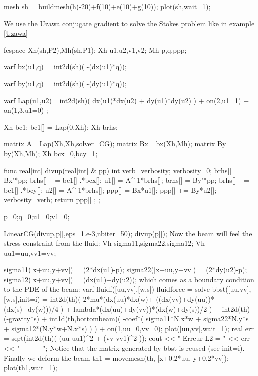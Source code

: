 \documentclass[twoside]{book}
\begin{document}
mesh sh = buildmesh(h(-20)+f(10)+e(10)+g(10));
plot(sh,wait=1);
\eFF
\huge

 We use the Uzawa conjugate gradient to solve the Stokes problem like in example \ref{Uzawa}

\bFF
\huge
fespace Xh(sh,P2),Mh(sh,P1);
Xh u1,u2,v1,v2;
Mh p,q,ppp;


varf bx(u1,q) = int2d(sh)( -(dx(u1)*q));

varf by(u1,q) = int2d(sh)( -(dy(u1)*q));

varf Lap(u1,u2)= int2d(sh)(  dx(u1)*dx(u2) + dy(u1)*dy(u2) )
                    +  on(2,u1=1) +  on(1,3,u1=0)  ;

Xh bc1; bc1[] = Lap(0,Xh);
Xh brhs;

matrix A= Lap(Xh,Xh,solver=CG);
matrix Bx= bx(Xh,Mh);
matrix By= by(Xh,Mh);
Xh bcx=0,bcy=1;

func real[int] divup(real[int] & pp)
{
  int verb=verbosity;
   verbosity=0;
   brhs[]  = Bx'*pp; brhs[] += bc1[] .*bcx[];
   u1[] = A^-1*brhs[];
   brhs[]  = By'*pp; brhs[] += bc1[] .*bcy[];
   u2[] = A^-1*brhs[];
   ppp[] =   Bx*u1[];
   ppp[] +=  By*u2[];
   verbosity=verb;
   return ppp[] ;
};

 p=0;q=0;u1=0;v1=0;

 LinearCG(divup,p[],eps=1.e-3,nbiter=50);
 divup(p[]);
\eFF
\huge
Now the beam will feel the stress constraint from the fluid:
\bFF
\huge
  Vh sigma11,sigma22,sigma12;
  Vh uu1=uu,vv1=vv;

  sigma11([x+uu,y+vv]) = (2*dx(u1)-p);
  sigma22([x+uu,y+vv]) = (2*dy(u2)-p);
  sigma12([x+uu,y+vv]) = (dx(u1)+dy(u2));
\eFF
\huge
which comes as a boundary condition to the PDE of the beam:
\bFF
\huge
varf fluidf([uu,vv],[w,s]) fluidforce =
solve  bbst([uu,vv],[w,s],init=i)  =
    int2d(th)(
                 2*mu*(dx(uu)*dx(w)+ ((dx(vv)+dy(uu))*(dx(s)+dy(w)))/4 )
               + lambda*(dx(uu)+dy(vv))*(dx(w)+dy(s))/2
             )
  + int2d(th) (-gravity*s)
  + int1d(th,bottombeam)( -coef*(   sigma11*N.x*w + sigma22*N.y*s 
                                   + sigma12*(N.y*w+N.x*s) )  )
  + on(1,uu=0,vv=0);
 plot([uu,vv],wait=1);
 real  err = sqrt(int2d(th)( (uu-uu1)^2 + (vv-vv1)^2 ));
 cout <<  " Erreur L2 = " << err << "----------\n";
\eFF
\huge
Notice that the matrix generated by bbst is reused (see init=i).
Finally we deform the beam
\bFF
\huge
 th1 = movemesh(th, [x+0.2*uu, y+0.2*vv]);
 plot(th1,wait=1);
\eFF
\end{document}
